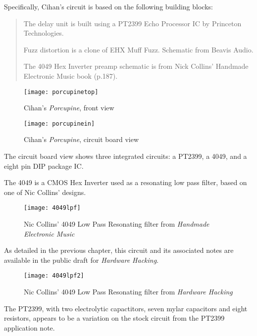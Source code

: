 Specifically, Cihan's circuit is based on the following building blocks: 
	
\begin{quote}
		
The delay unit is built using a PT2399 Echo Processor IC by Princeton Technologies.

Fuzz distortion is a clone of EHX Muff Fuzz. Schematic from Beavis Audio.

The 4049 Hex Inverter preamp schematic is from Nick Collins' Handmade Electronic Music book (p.187).
	
	\end{quote}

	\citep{cihan2015}

	\begin{figure}[h!]
	  \caption{Cihan's \emph{Porcupine}, front view}
	  \centering
	    \texttt{[image: porcupinetop]}
	\end{figure}
	
	\begin{figure}[h!]
	  \caption{Cihan's \emph{Porcupine}, circuit board view}
	  \centering
	    \texttt{[image: porcupinein]}
	\end{figure}
	
The circuit board view shows three integrated circuits: a PT2399, a 4049, and a eight pin DIP package IC.

The 4049 is a CMOS Hex Inverter used as a resonating low pass filter, based on one of Nic Collins' designs.

	\begin{figure}[h!]
	  \caption{Nic Collins' 4049 Low Pass Resonating filter from \emph{Handmade Electronic Music}}
	  \centering
	    \texttt{[image: 4049lpf]}
	\end{figure} 
	
As detailed in the previous chapter, this circuit and its associated notes are available in the public draft for \emph{Hardware Hacking}. 

	\begin{figure}[h!]
	  \caption{Nic Collins' 4049 Low Pass Resonating filter from \emph{Hardware Hacking}}
	  \centering
	    \texttt{[image: 4049lpf2]}
	\end{figure} 

The PT2399, with two electrolytic capactitors, seven mylar capacitors and eight resistors, appears to be a variation on the stock circuit from the PT2399 application note.

